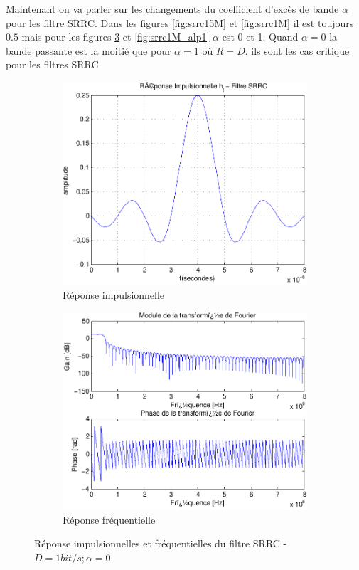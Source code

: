 \documentclass[a4paper,11pt]{article}
\begin{document}
Maintenant on va parler sur les changements du coefficient d'excès de bande $\alpha$ pour les filtre SRRC. Dans les figures \ref{fig:srrc15M} et \ref{fig:srrc1M} il est toujours $0.5$ mais pour les figures \ref{fig:srrc1M_alp0} et \ref{fig:srrc1M_alp1} $\alpha$ est 0 et 1. Quand $\alpha=0$ la bande passante est la moitié que pour $\alpha = 1$ où $R=D$. ils sont les cas critique pour les filtres SRRC.       

\begin{figure}[htb]
	\begin{subfigure}{.5\textwidth}
  		\centering
  		\includegraphics[width=1\linewidth]{impul_srrc_alpha_0-crop.pdf}
  		\caption{Réponse impulsionnelle}
  		\label{fig:srrc_impul1M_alp0}
	\end{subfigure}
	\begin{subfigure}{.5\textwidth}
  		\centering
  		\includegraphics[width=1\linewidth]{frec_srrc_alpha_0-crop.pdf}
  		\caption{Réponse fréquentielle}
  		\label{fig:srrc_frec15M_alp0}
	\end{subfigure}%
	\caption{Réponse impulsionnelles et fréquentielles du filtre SRRC - $D=1bit/s ; \alpha =0$.}
	\label{fig:srrc1M_alp0}
\end{figure}
\end{document}
